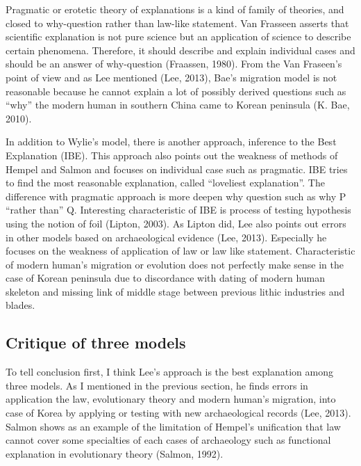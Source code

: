 \documentclass[american,man]{apa6}
\begin{document}
Pragmatic or erotetic theory of explanations is a kind of family of
theories, and closed to why-question rather than law-like statement. Van
Frasseen asserts that scientific explanation is not pure science but an
application of science to describe certain phenomena. Therefore, it
should describe and explain individual cases and should be an answer of
why-question (Fraassen, 1980). From the Van Fraseen's point of view and
as Lee mentioned (Lee, 2013), Bae's migration model is not reasonable
because he cannot explain a lot of possibly derived questions such as
\enquote{why} the modern human in southern China came to Korean
peninsula (K. Bae, 2010).

In addition to Wylie's model, there is another approach, inference to
the Best Explanation (IBE). This approach also points out the weakness
of methods of Hempel and Salmon and focuses on individual case such as
pragmatic. IBE tries to find the most reasonable explanation, called
\enquote{loveliest explanation}. The difference with pragmatic approach
is more deepen why question such as why P \enquote{rather than} Q.
Interesting characteristic of IBE is process of testing hypothesis using
the notion of foil (Lipton, 2003). As Lipton did, Lee also points out
errors in other models based on archaeological evidence (Lee, 2013).
Especially he focuses on the weakness of application of law or law like
statement. Characteristic of modern human's migration or evolution does
not perfectly make sense in the case of Korean peninsula due to
discordance with dating of modern human skeleton and missing link of
middle stage between previous lithic industries and blades.

\subsection{Critique of three models}\label{critique-of-three-models}

To tell conclusion first, I think Lee's approach is the best explanation
among three models. As I mentioned in the previous section, he finds
errors in application the law, evolutionary theory and modern human's
migration, into case of Korea by applying or testing with new
archaeological records (Lee, 2013). Salmon shows as an example of the
limitation of Hempel's unification that law cannot cover some
specialties of each cases of archaeology such as functional explanation
in evolutionary theory (Salmon, 1992).
\end{document}
